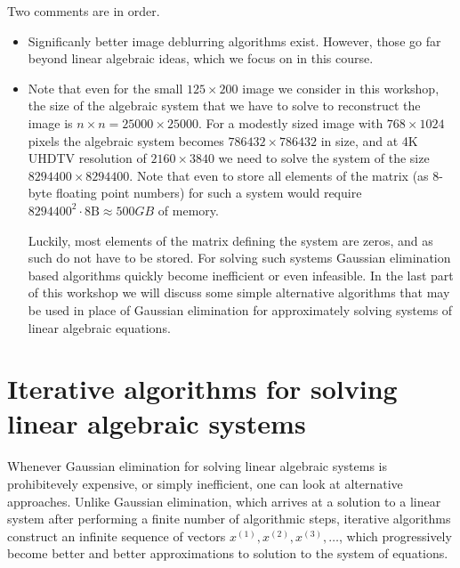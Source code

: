 \documentclass[10pt,a4paper]{article}
\theoremstyle{plain}
\theoremstyle{definition}
\begin{document}
Two comments are in order.
\begin{itemize}
  \item Significanly better image deblurring algorithms exist. However, those go far beyond linear algebraic ideas, which we focus on in this course.
  \item Note that even for the small \(125\times 200\) image we consider in this workshop, the size of the algebraic system that we have to solve to reconstruct the image is \(n \times n = 25000\times 25000\).
  For a modestly sized image with \(768\times 1024\) pixels the algebraic system becomes \(786432\times 786432\) in size,
  and at 4K UHDTV resolution  of \(2160\times 3840\) we need to solve the system of the size \(8294400 \times 8294400\).
  Note that even to store all elements of the matrix (as 8-byte floating point numbers) for such a system would require \(8294400^2 \cdot 8 \text{B} \approx 500 GB\) of memory.

  Luckily, most elements of the matrix defining the system are zeros,
  and as such do not have to be stored.
  For solving such systems Gaussian elimination based algorithms quickly become inefficient or even infeasible.
  In the last part of this workshop we will discuss some simple alternative algorithms that may be used in place of Gaussian elimination for approximately solving systems of linear algebraic equations.
\end{itemize}

\section{Iterative algorithms for solving linear algebraic systems}

Whenever Gaussian elimination for solving linear algebraic systems is prohibitevely expensive, or simply inefficient, one can look at alternative approaches.
Unlike Gaussian elimination, which arrives at a solution to a linear system after performing a finite number of algorithmic steps, iterative algorithms construct an infinite sequence of vectors \(x^{(1)}, x^{(2)}, x^{(3)}, \dots\), which progressively become better and better approximations to  solution to the system of equations.
\end{document}
